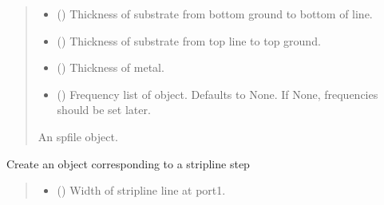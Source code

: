 \documentclass[letterpaper,10pt,english]{sphinxmanual}
\begin{document}
\begin{fulllineitems}
\begin{fulllineitems}
\begin{quote}
\begin{description}
\begin{itemize}
\item {}
\sphinxAtStartPar
{} () \textendash{} Thickness of substrate from bottom ground to bottom of line.

\item {}
\sphinxAtStartPar
{} () \textendash{} Thickness of substrate from top line to top ground.

\item {}
\sphinxAtStartPar
{} () \textendash{} Thickness of metal.

\item {}
\sphinxAtStartPar
{} (\sphinxstyleliteralemphasis{\sphinxupquote{, }}) \textendash{} Frequency list of object. Defaults to None. If None, frequencies should be set later.

\end{itemize}

\sphinxAtStartPar
An spfile object.

\sphinxAtStartPar
{\hyperref[\detokenize{touchstone:touchstone.spfile}]{}}

\end{description}\end{quote}

\end{fulllineitems}


\begin{fulllineitems}
\label{\detokenize{touchstone:touchstone.spfile.striplinestep}}
\pysigstartsignatures
{}
\pysigstopsignatures
\sphinxAtStartPar
Create an  object corresponding to a stripline step
\begin{quote}\begin{description}
\begin{itemize}
\item {}
\sphinxAtStartPar
{} () \textendash{} Width of stripline line at port\sphinxhyphen{}1.


\end{itemize}
\end{description}
\end{quote}
\end{fulllineitems}
\end{fulllineitems}
\end{document}

